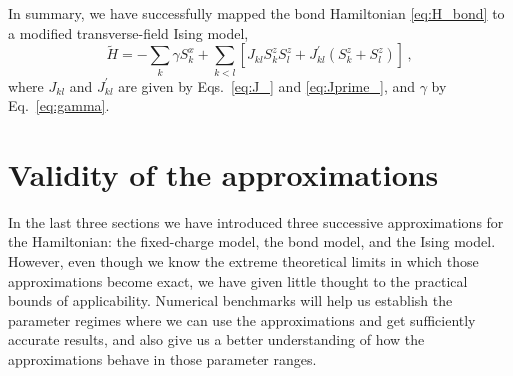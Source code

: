 In summary, we have successfully mapped the  bond Hamiltonian
\eqref{eq:H_bond} to a modified transverse-field Ising model,
\begin{equation}
  \label{eq:H_Ising}
  \tilde{H}
  =
  - \sum_k \gamma S^x_k
  + \sum_{k<l}
    \left[
      J_{kl} S^z_k S^z_l + 
      J^{\prime}_{kl} \left( S^z_k + S^z_l \right)
    \right] \, ,
\end{equation}
where $J_{kl}$ and $J^{\prime}_{kl}$ are given by Eqs.~\eqref{eq:J_} and
\eqref{eq:Jprime_}, and $\gamma$ by Eq.~\eqref{eq:gamma}.

\clearpage


\section{Validity of the approximations}
\label{sec:validity_of_the_approximations}

In the last three sections we have introduced three successive approximations
for the  Hamiltonian: the fixed-charge model, the bond model, and the
Ising model. However, even though we know the extreme theoretical limits in
which those approximations become exact, we have given little thought to the
practical bounds of applicability. Numerical benchmarks will help us establish
the parameter regimes where we can use the approximations and get sufficiently
accurate results, and also give us a better understanding of how the
approximations behave in those parameter ranges.

